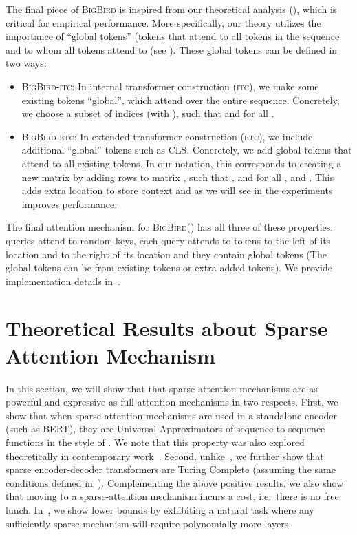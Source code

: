 \documentclass{article}
\newcommand{\bigb}{\textsc{BigBird}\xspace}
\begin{document}
The final piece of \bigb is inspired from our theoretical analysis  (), which is critical for empirical performance. 
More specifically, our theory utilizes the importance of ``global tokens'' (tokens that attend to all tokens in the sequence and to whom all tokens attend to (see ). 
These global tokens can be defined in two ways:
\begin{itemize}[leftmargin=6mm, itemsep=2mm, partopsep=0pt,parsep=0pt]
    \item \bigb-\textsc{itc}: In internal transformer construction (\textsc{itc}), we make some existing tokens ``global'', which attend over the entire sequence. Concretely, we choose a subset  of indices 
    (with ), such that  and  for all . \item \bigb-\textsc{etc}: In extended transformer construction (\textsc{etc}), we include additional ``global'' tokens such as CLS. Concretely, we add  global tokens that attend to all existing tokens. In our notation, this corresponds to creating a new matrix  by adding  rows to matrix , such that , and  for all , and . This adds extra location to store context and as we will see in the experiments improves performance.
\end{itemize}

The final attention mechanism for \bigb () has all three of these properties: queries attend to  random keys, each query attends to  tokens to the left of its location and  to the right of its location and they contain  global tokens (The global tokens can be from existing tokens or extra added tokens).
We provide implementation details in~.
 
\section{Theoretical Results about Sparse Attention Mechanism}
\label{sec:theory}

In this section, we will show that that sparse attention mechanisms are as 
powerful and expressive as full-attention mechanisms in two respects.
First, we show that when sparse attention mechanisms are used in a standalone encoder 
(such as BERT), they are Universal Approximators of sequence 
to sequence functions in the style of \citet{Yun19}. 
We note that this property was also explored theoretically in contemporary work~\citet{yun2020on}.
Second, unlike~\citep{yun2020on}, we further show that sparse encoder-decoder transformers are Turing Complete 
(assuming the same conditions defined in~\citep{Perez19}).
Complementing the above positive results, we also show that moving to a sparse-attention mechanism 
incurs a cost, i.e.~there is no free lunch. In~, we show lower bounds 
by exhibiting a natural task where any  sufficiently sparse  mechanism will 
require polynomially more layers. 
\end{document}
